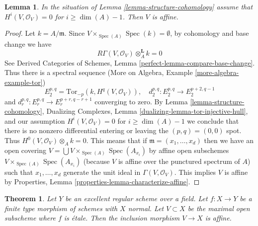 \documentclass{stacks-project}
\theoremstyle{plain}
\newtheorem{theorem}[subsection]{Theorem}
\newtheorem{lemma}[subsection]{Lemma}
\theoremstyle{definition}
\theoremstyle{remark}
\numberwithin{equation}{subsection}
\def\Spec{\mathop{\mathrm{Spec}}}
\begin{document}
\begin{lemma}
\label{lemma-conclude}
In the situation of Lemma \ref{lemma-structure-cohomology}
assume that $H^i(V, \mathcal{O}_V) = 0$ for $i \geq \dim(A) - 1$.
Then $V$ is affine.
\end{lemma}

\begin{proof}
Let $k = A/\mathfrak m$. Since $V \times_{\Spec(A)} \Spec(k) = \emptyset$,
by cohomology and base change we have
$$
R\Gamma(V, \mathcal{O}_V) \otimes_A^\mathbf{L} k = 0
$$
See
Derived Categories of Schemes, Lemma \ref{perfect-lemma-compare-base-change}.
Thus there is a spectral sequence
(More on Algebra, Example \ref{more-algebra-example-tor})
$$
E_2^{p, q} = \text{Tor}_{-p}(k, H^q(V, \mathcal{O}_V)),\quad
d_2^{p, q} : E_2^{p, q} \to E_2^{p + 2, q - 1}
$$
and $d_r^{p, q} : E_r^{p, q} \to E_r^{p + r, q - r + 1}$
converging to zero. By Lemma \ref{lemma-structure-cohomology},
Dualizing Complexes, Lemma \ref{dualizing-lemma-tor-injective-hull},
and our assumption $H^i(V, \mathcal{O}_V) = 0$ for $i \geq \dim(A) - 1$
we conclude that there is no nonzero differential
entering or leaving the $(p, q) = (0, 0)$ spot. Thus
$H^0(V, \mathcal{O}_V) \otimes_A k = 0$. This means that
if $\mathfrak m = (x_1, \ldots, x_d)$ then we have
an open covering $V = \bigcup V \times_{\Spec(A)} \Spec(A_{x_i})$
by affine open subschemes $V \times_{\Spec(A)} \Spec(A_{x_i})$
(because $V$ is affine over the punctured spectrum of $A$)
such that $x_1, \ldots, x_d$ generate
the unit ideal in $\Gamma(V, \mathcal{O}_V)$.
This implies $V$ is affine by
Properties, Lemma \ref{properties-lemma-characterize-affine}.
\end{proof}

\begin{theorem}
\label{theorem-global}
Let $Y$ be an excellent regular scheme over a field. Let $f : X \to Y$
be a finite type morphism of schemes with $X$ normal. Let $V \subset X$
be the maximal open subscheme where $f$ is \'etale. Then the inclusion
morphism $V \to X$ is affine.
\end{theorem}
\end{document}
